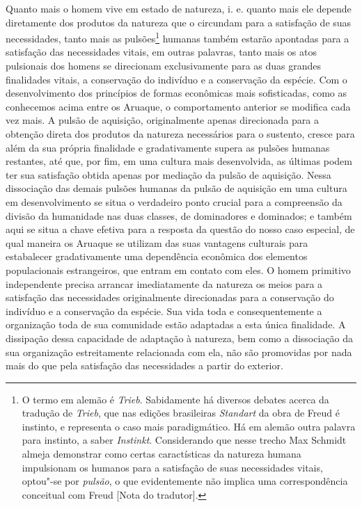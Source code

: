Quanto mais o homem vive em estado de natureza, i. e. quanto mais ele
depende diretamente dos produtos da natureza que o circundam para a
satisfação de suas necessidades, tanto mais as pulsões\footnote[*]{O termo em alemão é \emph{Trieb}. Sabidamente há diversos debates
  acerca da tradução de \emph{Trieb}, que nas edições brasileiras
  \emph{Standart} da obra de Freud é instinto, e representa o caso mais
  paradigmático. Há em alemão outra palavra para instinto, a saber
  \emph{Instinkt}. Considerando que nesse trecho Max Schmidt almeja
  demonstrar como certas caractísticas da natureza humana impulsionam os
  humanos para a satisfação de suas necessidades vitais, optou"-se por
  \emph{pulsão}, o que evidentemente não implica uma correspondência
  conceitual com Freud {[}Nota do tradutor{]}.} humanas também
estarão apontadas para a satisfação das necessidades vitais, em outras
palavras, tanto mais os atos pulsionais dos homens se direcionam
exclusivamente para as duas grandes finalidades vitais, a conservação
do indivíduo e a conservação da espécie. Com o desenvolvimento dos
princípios de formas econômicas mais sofisticadas, como as conhecemos
acima entre os Aruaque, o comportamento anterior se modifica cada vez
mais. A pulsão de aquisição, originalmente apenas direcionada para a
obtenção direta dos produtos da natureza necessários para o sustento,
cresce para além da sua própria finalidade e gradativamente supera as
pulsões humanas restantes, até que, por fim, em uma cultura mais
desenvolvida, as últimas podem ter sua satisfação obtida apenas por
mediação da pulsão de aquisição. Nessa dissociação das demais pulsões
humanas da pulsão de aquisição em uma cultura em desenvolvimento se
situa o verdadeiro ponto crucial para a compreensão da divisão da
humanidade nas duas classes, de dominadores e dominados; e também aqui
se situa a chave efetiva para a resposta da questão do nosso caso
especial, de qual maneira os Aruaque se utilizam das suas vantagens
culturais para estabalecer gradativamente uma dependência econômica
dos elementos populacionais estrangeiros, que entram em contato com
eles. O homem primitivo independente precisa arrancar imediatamente da
natureza os meios para a satisfação das necessidades originalmente
direcionadas para a conservação do indivíduo e a conservação da
espécie. Sua vida toda e consequentemente a organização toda de sua
comunidade estão adaptadas a esta única finalidade. A dissipação dessa
capacidade de adaptação à natureza, bem como a dissociação da sua
organização estreitamente relacionada com ela, não são promovidas por
nada mais do que pela satisfação das necessidades a partir do exterior.
